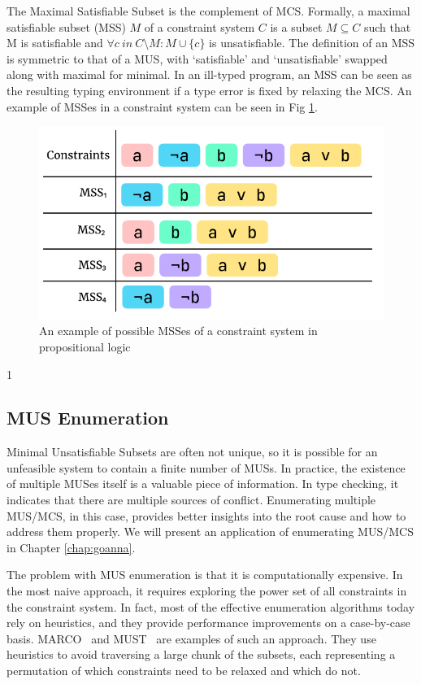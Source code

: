 The Maximal Satisfiable Subset is the complement of MCS. Formally, a maximal satisfiable subset (MSS) $M$ of a constraint system $C$ is a subset $M \subseteq C$ such that M is satisfiable and $\forall{c}\ in\ C \setminus M:M\cup\{c\}$ is unsatisfiable. The definition of an MSS is symmetric to that of a MUS, with `satisfiable' and `unsatisfiable' swapped along with maximal for minimal. In an ill-typed program, an MSS can be seen as the resulting typing environment if a type error is fixed by relaxing the MCS. An example of MSSes in a constraint system can be seen in Fig \ref{fig:mss-example}.


\begin{figure}[hbt]
  \includegraphics[width=0.8\linewidth]{MSS}
  \caption{
    \label{fig:mss-example}
      An example of possible MSSes of a constraint system in propositional logic}
\end{figure}1

\subsection{MUS Enumeration}
 Minimal Unsatisfiable Subsets are often not unique, so it is possible for an unfeasible system to contain a finite number of MUSs. In practice, the existence of multiple MUSes itself is a valuable piece of information. In type checking, it indicates that there are multiple sources of conflict. Enumerating multiple MUS/MCS, in this case, provides better insights into the root cause and how to address them properly. We will present an application of enumerating MUS/MCS in Chapter \ref{chap:goanna}.

The problem with MUS enumeration is that it is computationally expensive. In the most naive approach, it requires exploring the power set of all constraints in the constraint system. In fact, most of the effective enumeration algorithms today rely on heuristics, and they provide performance improvements on a case-by-case basis. MARCO~\cite{Liffiton2016-xi} and MUST~\cite{Bendik2020-pz} are examples of such an approach. They use heuristics to avoid traversing a large chunk of the subsets, each representing a permutation of which constraints need to be relaxed and which do not.



